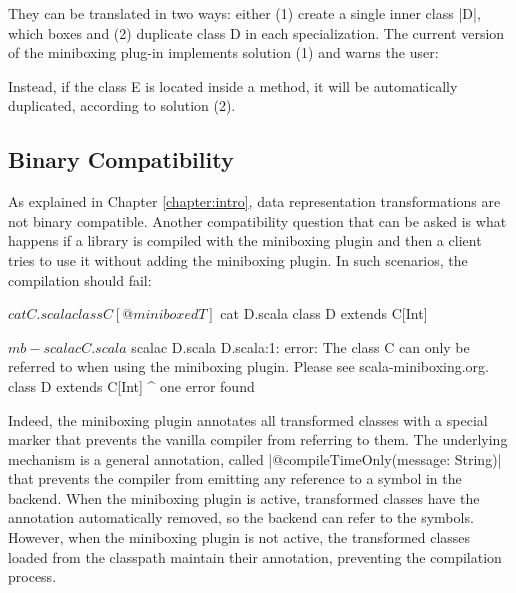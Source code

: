 They can be translated in two ways: either (1) create a single inner class |D|, which boxes and (2) duplicate class D in each specialization. The current version of the miniboxing plug-in implements solution (1) and warns the user:


Instead, if the class E is located inside a method, it will be automatically duplicated, according to solution (2).

\subsection{Binary Compatibility}

As explained in Chapter \ref{chapter:intro}, data representation transformations are not binary compatible. Another compatibility question that can be asked is what happens if a library is compiled with the miniboxing plugin and then a client tries to use it without adding the miniboxing plugin. In such scenarios, the compilation should fail:

\begin{lstlisting-nobreak-nolang}
$ cat C.scala
class C[@miniboxed T]

$ cat D.scala
class D extends C[Int]

$ mb-scalac C.scala

$ scalac D.scala
D.scala:1: error: The class C can only be referred to when using the miniboxing plugin. Please see scala-miniboxing.org.
class D extends C[Int]
                ^
one error found
\end{lstlisting-nobreak-nolang}

Indeed, the miniboxing plugin annotates all transformed classes with a special marker that prevents the vanilla compiler from referring to them. The underlying mechanism is a general annotation, called |@compileTimeOnly(message: String)| that prevents the compiler from emitting any reference to a symbol in the backend. When the miniboxing plugin is active, transformed classes have the annotation automatically removed, so the backend can refer to the symbols. However, when the miniboxing plugin is not active, the transformed classes loaded from the classpath maintain their annotation, preventing the compilation process.